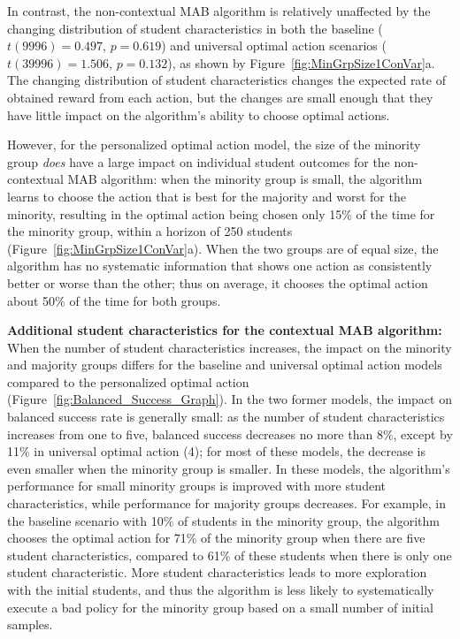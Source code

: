In contrast, the non-contextual MAB algorithm is relatively unaffected by the changing distribution of student characteristics in both the baseline ($t(9996)=0.497$, $p=0.619$) and universal optimal action scenarios ($t(39996)=1.506$, $p=0.132$), as shown by Figure~\ref{fig:MinGrpSize1ConVar}a. The changing distribution of student characteristics changes the expected rate of obtained reward from each action, but the changes are small enough that they have little impact on the algorithm's ability to choose optimal actions.

However, for the personalized optimal action model, the size of the minority group \textit{does} have a large impact on individual student outcomes for the non-contextual MAB algorithm: when the minority group is small, the algorithm learns to choose the action that is best for the majority and worst for the minority, resulting in the optimal action being chosen only 15\% of the time for the minority group, within a horizon of 250 students (Figure~\ref{fig:MinGrpSize1ConVar}a). When the two groups are of equal size, the algorithm has no systematic information that shows one action as consistently better or worse than the other; thus on average, it chooses the optimal action about 50\% of the time for both groups. 


\textbf{Additional student characteristics for the contextual MAB algorithm:} When the number of student characteristics increases, the impact on the minority and majority groups differs for the baseline and universal optimal action models compared to the personalized optimal action  (Figure~\ref{fig:Balanced_Success_Graph}). In the two former models, the impact on balanced success rate is generally small: as the number of student characteristics increases from one to five, balanced success decreases no more than 8\%, except by 11\% in universal optimal action (4); for most of these models, the decrease is even smaller when the minority group is smaller.
In these models, the algorithm's performance for small minority groups is improved with more student characteristics, while performance for majority groups decreases. For example, in the baseline scenario with 10\% of students in the minority group, the algorithm chooses the optimal action for 71\% of the minority group when there are five student characteristics, compared to 61\% of these students when there is only one student characteristic.
More student characteristics leads to more exploration with the initial students, and thus the algorithm is less likely to systematically execute a bad policy for the minority group based on a small number of initial samples. 

